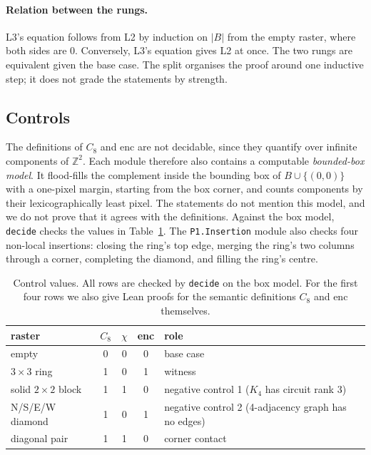 \documentclass[11pt]{article}
\theoremstyle{definition}
\theoremstyle{remark}
\begin{document}
\paragraph{Relation between the rungs.} L3's equation follows from L2 by
induction on $|B|$ from the empty raster, where both sides are $0$. Conversely,
L3's equation gives L2 at once. The two rungs are equivalent given the base case.
The split organises the proof around one inductive step; it does not grade the
statements by strength.

\subsection{Controls}

The definitions of $C_8$ and $\mathrm{enc}$ are not decidable, since they
quantify over infinite components of $\mathbb{Z}^2$. Each module therefore also
contains a computable \emph{bounded-box model}. It flood-fills the complement
inside the bounding box of $B\cup\{(0,0)\}$ with a one-pixel margin, starting
from the box corner, and counts components by their lexicographically least
pixel. The statements do not mention this model, and we do not prove that it
agrees with the definitions. Against the box model, \texttt{decide} checks the
values in Table~\ref{tab:controls}. The \texttt{P1.Insertion} module also checks
four non-local insertions: closing the ring's top edge, merging the ring's two
columns through a corner, completing the diamond, and filling the ring's centre.

\begin{table}[h]
\centering
\begin{tabular}{lcccl}
\toprule
raster & $C_8$ & $\chi$ & enc & role\\
\midrule
empty & 0 & 0 & 0 & base case\\
$3\times3$ ring & 1 & 0 & 1 & witness\\
solid $2\times2$ block & 1 & 1 & 0 & negative control 1 ($K_4$ has circuit rank 3)\\
N/S/E/W diamond & 1 & 0 & 1 & negative control 2 (4-adjacency graph has no edges)\\
diagonal pair & 1 & 1 & 0 & corner contact\\
\bottomrule
\end{tabular}
\caption{Control values. All rows are checked by \texttt{decide} on the box
model. For the first four rows we also give Lean proofs for the semantic
definitions $C_8$ and $\mathrm{enc}$ themselves.}
\label{tab:controls}
\end{table}
\end{document}
